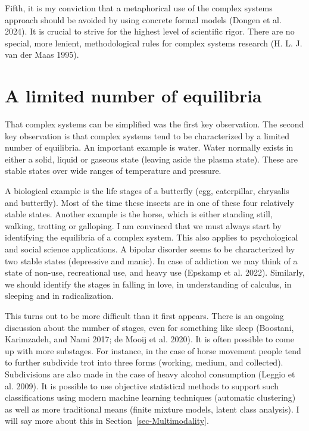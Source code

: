 \documentclass[
  a4paper,
  DIV=11,
  numbers=noendperiod,
  oneside]{scrreprt}
\begin{document}
Fifth, it is my conviction that a metaphorical use of the complex
systems approach should be avoided by using concrete formal models
(Dongen et al. 2024). It is crucial to strive for the highest level of
scientific rigor. There are no special, more lenient, methodological
rules for complex systems research (H. L. J. van der Maas 1995).

\hypertarget{sec-A-limited-number-of-equilibria}{%
\section{A limited number of
equilibria}\label{sec-A-limited-number-of-equilibria}}

That complex systems can be simplified was the first key observation.
The second key observation is that complex systems tend to be
characterized by a limited number of equilibria. An important example is
water. Water normally exists in either a solid, liquid or gaseous state
(leaving aside the plasma state). These are stable states over wide
ranges of temperature and pressure.

A biological example is the life stages of a butterfly (egg,
caterpillar, chrysalis and butterfly). Most of the time these insects
are in one of these four relatively stable states. Another example is
the horse, which is either standing still, walking, trotting or
galloping. I am convinced that we must always start by identifying the
equilibria of a complex system. This also applies to psychological and
social science applications. A bipolar disorder seems to be
characterized by two stable states (depressive and manic). In case of
addiction we may think of a state of non-use, recreational use, and
heavy use (Epskamp et al. 2022). Similarly, we should identify the
stages in falling in love, in understanding of calculus, in sleeping and
in radicalization.

This turns out to be more difficult than it first appears. There is an
ongoing discussion about the number of stages, even for something like
sleep (Boostani, Karimzadeh, and Nami 2017; de Mooij et al. 2020). It is
often possible to come up with more substages. For instance, in the case
of horse movement people tend to further subdivide trot into three forms
(working, medium, and collected). Subdivisions are also made in the case
of heavy alcohol consumption (Leggio et al. 2009). It is possible to use
objective statistical methods to support such classifications using
modern machine learning techniques (automatic clustering) as well as
more traditional means (finite mixture models, latent class analysis). I
will say more about this in Section~\ref{sec-Multimodality}.
\end{document}
